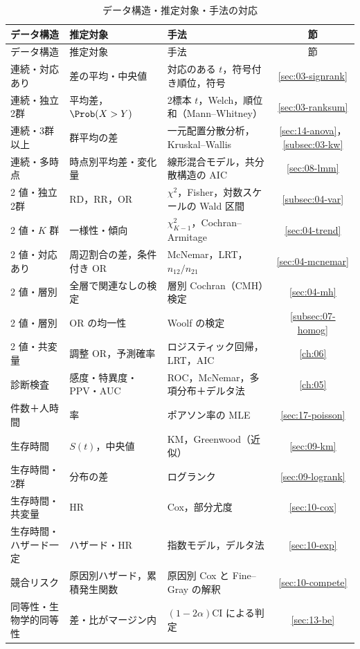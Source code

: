 \begin{center}\small
\begin{longtable}{@{}L{36mm}L{30mm}L{52mm}c@{}}
\caption{データ構造・推定対象・手法の対応}\label{tab:A-select}\\
\toprule
データ構造 & 推定対象 & 手法 & 節\\
\midrule
\endfirsthead
\toprule
データ構造 & 推定対象 & 手法 & 節\\
\midrule
\endhead
\bottomrule
\endfoot
連続・対応あり & 差の平均・中央値 & 対応のある $t$，符号付き順位，符号 & \ref{sec:03-signrank}\\
連続・独立2群 & 平均差，$\Prob(X>Y)$ & 2標本 $t$，Welch，順位和（Mann--Whitney） & \ref{sec:03-ranksum}\\
連続・3群以上 & 群平均の差 & 一元配置分散分析，Kruskal--Wallis & \ref{sec:14-anova}，\ref{subsec:03-kw}\\
連続・多時点 & 時点別平均差・変化量 & 線形混合モデル，共分散構造の AIC & \ref{sec:08-lmm}\\
2 値・独立2群 & RD，RR，OR & $\chi^2$，Fisher，対数スケールの Wald 区間 & \ref{subsec:04-var}\\
2 値・$K$ 群 & 一様性・傾向 & $\chi^2_{K-1}$，Cochran--Armitage & \ref{sec:04-trend}\\
2 値・対応あり & 周辺割合の差，条件付き OR & McNemar，LRT，$n_{12}/n_{21}$ & \ref{sec:04-mcnemar}\\
2 値・層別 & 全層で関連なしの検定 & 層別 Cochran（CMH）検定 & \ref{sec:04-mh}\\
2 値・層別 & OR の均一性 & Woolf の検定 & \ref{subsec:07-homog}\\
2 値・共変量 & 調整 OR，予測確率 & ロジスティック回帰，LRT，AIC & \ref{ch:06}\\
診断検査 & 感度・特異度・PPV・AUC & ROC，McNemar，多項分布＋デルタ法 & \ref{ch:05}\\
件数＋人時間 & 率 & ポアソン率の MLE & \ref{sec:17-poisson}\\
生存時間 & $S(t)$，中央値 & KM，Greenwood（近似） & \ref{sec:09-km}\\
生存時間・2群 & 分布の差 & ログランク & \ref{sec:09-logrank}\\
生存時間・共変量 & HR & Cox，部分尤度 & \ref{sec:10-cox}\\
生存時間・ハザード一定 & ハザード・HR & 指数モデル，デルタ法 & \ref{sec:10-exp}\\
競合リスク & 原因別ハザード，累積発生関数 & 原因別 Cox と Fine--Gray の解釈 & \ref{sec:10-compete}\\
同等性・生物学的同等性 & 差・比がマージン内 & $(1-2\alpha)$CI による判定 & \ref{sec:13-be}\\

\end{longtable}
\end{center}

